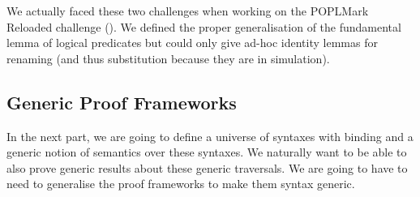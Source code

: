 We actually faced these two challenges when working on the POPLMark Reloaded challenge
(\cite{poplmark2}). We defined the proper generalisation of the fundamental lemma of
logical predicates but could only give ad-hoc identity lemmas for renaming (and thus
substitution because they are in simulation).

\subsection{Generic Proof Frameworks}

In the next part, we are going to define a universe of syntaxes with binding and a generic
notion of semantics over these syntaxes. We naturally want to be able to also prove generic
results about these generic traversals. We are going to have to need to generalise the proof
frameworks to make them syntax generic.
